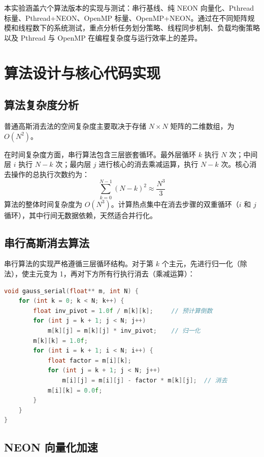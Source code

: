 \documentclass[a4paper]{article}
\begin{document}
本实验涵盖六个算法版本的实现与测试：串行基线、纯 NEON 向量化、Pthread 标量、Pthread+NEON、OpenMP 标量、OpenMP+NEON。通过在不同矩阵规模和线程数下的系统测试，重点分析任务划分策略、线程同步机制、负载均衡策略以及 Pthread 与 OpenMP 在编程复杂度与运行效率上的差异。

\section{算法设计与核心代码实现}

\subsection{算法复杂度分析}

普通高斯消去法的空间复杂度主要取决于存储 $N \times N$ 矩阵的二维数组，为 $O(N^2)$。

在时间复杂度方面，串行算法包含三层嵌套循环。最外层循环 $k$ 执行 $N$ 次；中间层 $i$ 执行 $N-k$ 次；最内层 $j$ 进行核心的消去乘减运算，执行 $N-k$ 次。核心消去操作的总执行次数约为：
\begin{equation}
\sum_{k=0}^{N-1} (N-k)^2 \approx \frac{N^3}{3}
\end{equation}
算法的整体时间复杂度为 $O(N^3)$。计算热点集中在消去步骤的双重循环（$i$ 和 $j$ 循环），其中行间无数据依赖，天然适合并行化。

\subsection{串行高斯消去算法}

串行算法的实现严格遵循三层循环结构。对于第 $k$ 个主元，先进行归一化（除法），使主元变为 1，再对下方所有行执行消去（乘减运算）：

\begin{lstlisting}[title=普通高斯消去串行算法,frame=trbl,language={C++}]
void gauss_serial(float** m, int N) {
    for (int k = 0; k < N; k++) {
        float inv_pivot = 1.0f / m[k][k];     // 预计算倒数
        for (int j = k + 1; j < N; j++)
            m[k][j] = m[k][j] * inv_pivot;    // 归一化
        m[k][k] = 1.0f;
        for (int i = k + 1; i < N; i++) {
            float factor = m[i][k];
            for (int j = k + 1; j < N; j++)
                m[i][j] = m[i][j] - factor * m[k][j];  // 消去
            m[i][k] = 0.0f;
        }
    }
}
\end{lstlisting}

\subsection{NEON 向量化加速}
\end{document}
